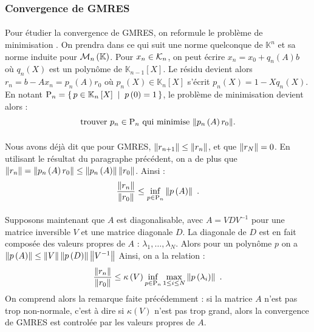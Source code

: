 		\subsubsection{Convergence de GMRES}

			\paragraph{}
			Pour étudier la convergence de GMRES, on reformule le problème de minimisation \cite{TrefethenBau1997}.
			On prendra dans ce qui suit une norme quelconque de $\mathbb{K}^n$ et sa norme induite pour $\mathcal{M}_{n}\left(\mathbb{K}\right)$.
			Pour $x_n\in\krylov{n}$, on peut écrire $x_n = x_0 + q_n\left(A\right)b$ où $q_n\left(X\right)$ est un polynôme de $\mathbb{K}_{n-1}\left[X\right]$.
			Le résidu devient alors $r_n = b - Ax_n = p_n\left(A\right)r_0$ où $p_n\left(X\right)\in\mathbb{K}_n\left[X\right]$ s'écrit $p_n\left(X\right) = 1 - Xq_n\left(X\right)$.
			En notant $\textup{P}_n = \left\{\,p\in\mathbb{K}_n\left[X\right]\;\mid\;p\left(0\right) = 1\,\right\}$, le problème de minimisation devient alors :
			\[\textrm{trouver $p_n\in \textup{P}_n$ qui minimise $\norm{p_n\left(A\right)r_0}$.}\]


			\paragraph{}
			Nous avons déjà dit que pour GMRES, $\norm{r_{n+1}}\leq\norm{r_n}$, et que $\norm{r_N} = 0$.
			En utilisant le résultat du paragraphe précédent, on a de plus que $\norm{r_n} = \norm{p_n\left(A\right)r_0}\leq\norm{p_n\left(A\right)}\norm{r_0}$. Ainsi :
			\[\frac{\norm{r_n}}{\norm{r_0}} \leq \inf_{p\in\textup{P}_n}\norm{p\left(A\right)}\ .\]

			\paragraph{}
			Supposons maintenant que $A$ est diagonalisable, avec $A = VDV^{-1}$ pour une matrice inversible $V$ et une matrice diagonale $D$.
			La diagonale de $D$ est en fait composée des valeurs propres de $A$ : $\lambda_1, \dots, \lambda_N$.
			Alors pour un polynôme $p$ on a $\norm{p\left(A\right)}\leq\norm{V}\norm{p\left(D\right)}\norm{V^{-1}}$
			Ainsi, on a la relation :
			\[\frac{\norm{r_n}}{\norm{r_0}} \leq \kappa\left(V\right)\inf_{p\in\textup{P}_n}\max_{1\leq i\leq N}\norm{p\left(\lambda_i\right)}\ .\]
			On comprend alors la remarque faite précédemment : si la matrice $A$ n'est pas trop non-normale, c'est à dire si $\kappa\left(V\right)$ n'est pas trop grand, alors la convergence de GMRES est controlée par les valeurs propres de $A$.



